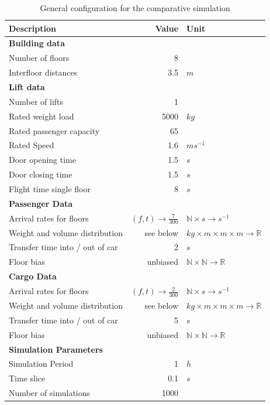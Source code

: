 \begin{table}[]
\centering
\begin{tabular}{lrl}
\textbf{Description} \hspace{5cm}   & \textbf{Value}   & \textbf{Unit}   \\
\hline
\multicolumn{3}{l}{\textbf{Building data}} \\
Number of floors & 8 &        \\
Interfloor distances & 3.5 & $m$\\
\hline
\multicolumn{3}{l}{\textbf{Lift data}}     \\
Number of lifts & 1 & \\
Rated weight load & 5000 & $kg$\\
Rated passenger capacity & 65 & \\
Rated Speed & 1.6 & $ms^{-1}$ \\
Door opening time & 1.5 & $s$\\
Door closing time & 1.5 & $s$\\
Flight time single floor & 8 & $s$\\
\hline
\multicolumn{3}{l}{\textbf{Passenger Data}}\\
Arrival rates for floors & $ (f, t) \rightarrow \frac{7}{300} $ & $ \mathbb{N} \times s \rightarrow s^{-1}$\\
Weight and volume distribution & see below & $kg \times m \times m \times m \rightarrow \mathbb{R}$\\
Transfer time into / out of car & 2 & $s$\\
Floor bias & unbiased & $ \mathbb{N} \times \mathbb{N} \rightarrow \mathbb{R} $ \\
\hline
\multicolumn{3}{l}{\textbf{Cargo Data}}\\
Arrival rates for floors & $ (f, t) \rightarrow \frac{2}{300} $ & $\mathbb{N} \times s \rightarrow s^{-1}$\\
Weight and volume distribution & see below & $kg \times m \times m \times m \rightarrow \mathbb{R}$\\
Transfer time into / out of car & 5 & $s$\\
Floor bias & unbiased & $ \mathbb{N} \times \mathbb{N} \rightarrow \mathbb{R} $ \\
\hline
\multicolumn{3}{l}{\textbf{Simulation Parameters}}\\
Simulation Period & 1 & $h$\\
Time slice & 0.1 & $s$\\
Number of simulations & 1000 & \\
\end{tabular}
\caption{\label{tab:design:simulationconfig} General configuration for the comparative simulation}
\end{table}

